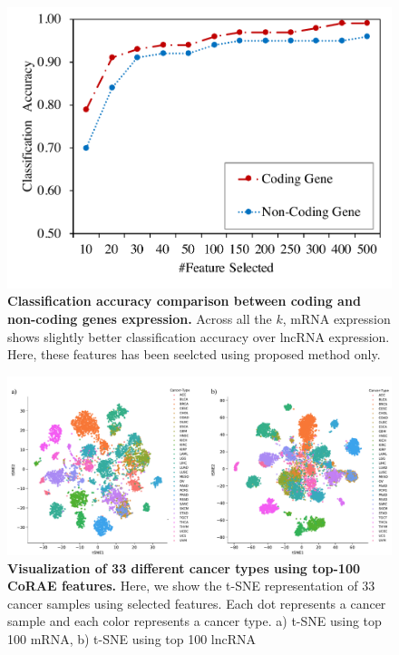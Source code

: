 \documentclass{bioinfo}
\begin{document}
  \begin{figure}[hbt]
    \centering
    \includegraphics[scale=0.45]{fig/acc-mRNA-lncRNA.pdf}
    \caption{\textbf{Classification accuracy comparison between coding and non-coding genes expression.} Across all the $k$, mRNA expression shows slightly better classification accuracy over lncRNA expression. Here, these features has been seelcted using proposed method only.}
    \label{fig:acc-mRNA-lncRNA}
\end{figure}
\begin{figure}[bt]
  \centering
  \includegraphics[scale=0.45]{fig/tSNE.pdf}
    \caption{\textbf{Visualization of 33 different cancer types using top-100 CoRAE features.} Here, we show the t-SNE representation of 33 cancer samples using selected features. Each dot represents a cancer sample and each color represents a cancer type. a) t-SNE using top 100 mRNA, b) t-SNE using top 100 lncRNA}
    \label{fig:tsne}
\end{figure}
\end{document}
